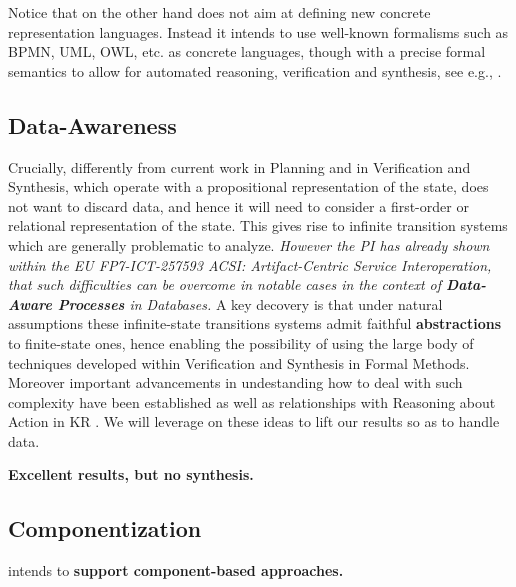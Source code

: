 Notice that on the other hand \project does not aim at defining new
concrete representation languages. Instead it intends to use
well-known formalisms such as BPMN, UML, OWL, etc. as concrete
languages, though with a precise formal semantics to allow for
automated reasoning, verification and synthesis, see e.g.,
\cite{BerardiCG05,DeGiacomoOET17}.




\subsection{Data-Awareness}


Crucially, differently from current work in Planning and in
Verification and Synthesis, which operate with a propositional
representation of the state, \project does not want to discard data, and hence
it will need to consider a first-order or relational representation of
the state. This gives rise to infinite transition systems which are generally problematic to analyze.
\emph{However the PI
has already shown within the EU FP7-ICT-257593 ACSI: Artifact-Centric
Service Interoperation, that such difficulties can be overcome in
notable cases
\cite{BerardiCGHM05,CalvaneseGHS09,HaririCGDM13,CalvaneseGMP13} in the context of \textbf{Data-Aware Processes} in Databases.} A key
decovery is that under natural assumptions these infinite-state
transitions systems admit faithful \textbf{abstractions} to
finite-state ones, hence enabling the possibility of using the large
body of techniques developed within  Verification and Synthesis in
Formal Methods. Moreover important advancements in undestanding how to
deal with such complexity have been established as well as
relationships with Reasoning about Action in KR
\cite{HaririCMGMF13,BelardinelliLP14,CalvaneseGS15,CDMP17,BanihashemiGL17}.
We will leverage on these ideas to lift our results so
as to handle data.

\textbf{Excellent results, but no synthesis.}

\subsection{Componentization}
\project intends to \textbf{support component-based approaches.} 


